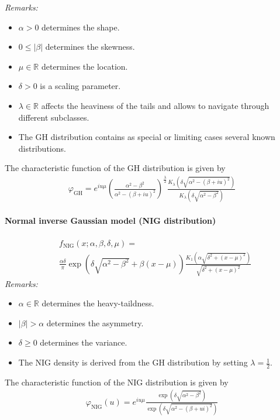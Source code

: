 \documentclass[a4paper,landscape,7pt,fleqn]{scrartcl}
\begin{document}
\begin{multicols*}{3}
\textit{Remarks:}
\begin{itemize}
\item $\alpha > 0$ determines the shape.
\item $0 \leq |\beta|$ determines the skewness.
\item $\mu \in \mathbb{R}$ determines the location.
\item $\delta > 0$ is a scaling parameter.
\item $\lambda \in \mathbb{R}$ affects the heaviness of the tails and allows to navigate through different subclasses.
\item The GH distribution contains as special or limiting cases several known distributions.
\end{itemize}

The characteristic function of the GH distribution is given by
\begin{align*}
\varphi_\text{GH} = e^{i u \mu} \left( \frac{\alpha^2 - \beta^2}{\alpha^2 - (\beta + i u)^2} \right)^\frac{\lambda}{2} \frac{K_\lambda (\delta \sqrt{\alpha^2 - (\beta + iu)^2})}{K_\lambda (\delta \sqrt{\alpha^2 - \beta^2})}
\end{align*}

\paragraph{Normal inverse Gaussian model (NIG distribution)}
\begin{align*}
& f_\text{NIG}(x; \alpha, \beta, \delta, \mu) = \\
& \frac{\alpha \delta}{\pi} \exp \left( \delta \sqrt{\alpha^2 - \beta^2} + \beta (x - \mu) \right) \frac{K_1 (\alpha \sqrt{\delta^2 + (x-\mu)^2})}{\sqrt{\delta^2 + (x-\mu)^2}}
\end{align*}
\textit{Remarks:}
\begin{itemize}
\item $\alpha \in \mathbb{R}$ determines the heavy-taildness.
\item $|\beta| > \alpha$ determines the asymmetry.
\item $\delta \geq 0$ determines the variance.
\item The NIG density is derived from the GH distribution by setting $\lambda = \frac{1}{2}$.
\end{itemize}
The characteristic function of the NIG distribution is given by
\begin{align*}
\varphi_\text{NIG}(u) = e^{i u \mu} \frac{\exp \left( \delta \sqrt{\alpha^2 - \beta^2} \right)}{\exp \left( \delta \sqrt{\alpha^2 - (\beta + u i)^2} \right)}
\end{align*}


\end{multicols*}
\end{document}
